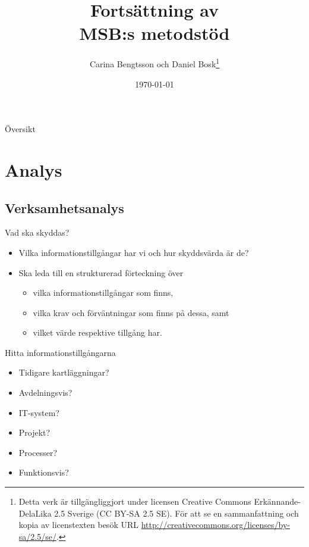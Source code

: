 \documentclass{beamer}
\title[Intro infosäk]{%
  Fortsättning av\\
  MSB:s metodstöd
}
\author{Carina Bengtsson och Daniel Bosk\footnote{%
  Detta verk är tillgängliggjort under licensen Creative Commons 
  Erkännande-DelaLika 2.5 Sverige (CC BY-SA 2.5 SE).
	För att se en sammanfattning och kopia av licenstexten besök URL 
	\url{http://creativecommons.org/licenses/by-sa/2.5/se/}.
}}
\institute[MIUN ITM]{%
  Avdelningen för informations- och kommunikationssytem,\\
  Mittuniversitetet, Sundsvall.
}
\date{\today}
\begin{document}
\begin{frame}
  \titlepage{}
\end{frame}

\begin{frame}{Översikt}
  \begin{multicols}{2}
    \tableofcontents
  \end{multicols}
\end{frame}




\section{Analys}

\subsection{Verksamhetsanalys}

\begin{frame}{Vad ska skyddas?}
  \begin{itemize}
    \item Vilka informationstillgångar har vi och hur skyddsvärda är de?
    \item Ska leda till en strukturerad förteckning över
      \begin{itemize}
        \item vilka informationstillgångar som finns,
        \item vilka krav och förväntningar som finns på dessa, samt
        \item vilket värde respektive tillgång har.
      \end{itemize}
  \end{itemize}
\end{frame}

\begin{frame}{Hitta informationstillgångarna}
  \begin{itemize}
    \item Tidigare kartläggningar?
    \item Avdelningsvis?
    \item IT-system?
    \item Projekt?
    \item Processer?
    \item Funktionsvis?
  \end{itemize}
\end{frame}
\end{document}
